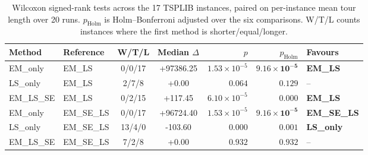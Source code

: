 
\begin{table}[tp]
  \centering
  \caption{Wilcoxon signed-rank tests across the 17 TSPLIB instances, paired on per-instance mean tour length over 20 runs. $p_{\text{Holm}}$ is Holm--Bonferroni adjusted over the six comparisons. W/T/L counts instances where the first method is shorter/equal/longer.}
  \label{tab:wilcoxon-overall}
  \small
  \begin{tabular}{llccrrl}
    \toprule
    Method & Reference & W/T/L & Median $\Delta$ & $p$ & $p_{\text{Holm}}$ & Favours \\
    \midrule
    EM\_only & EM\_LS & 0/0/17 & +97386.25 & $1.53\times 10^{-5}$ & $\mathbf{9.16\times 10^{-5}}$ & \textbf{EM\_LS} \\
    LS\_only & EM\_LS & 2/7/8 & +0.00 & $0.064$ & $0.129$ & -- \\
    EM\_LS\_SE & EM\_LS & 0/2/15 & +117.45 & $6.10\times 10^{-5}$ & $\mathbf{0.000}$ & \textbf{EM\_LS} \\
    EM\_only & EM\_SE\_LS & 0/0/17 & +96724.40 & $1.53\times 10^{-5}$ & $\mathbf{9.16\times 10^{-5}}$ & \textbf{EM\_SE\_LS} \\
    LS\_only & EM\_SE\_LS & 13/4/0 & -103.60 & $0.000$ & $\mathbf{0.001}$ & \textbf{LS\_only} \\
    EM\_LS\_SE & EM\_SE\_LS & 7/2/8 & +0.00 & $0.932$ & $0.932$ & -- \\
    \bottomrule
  \end{tabular}
\end{table}


